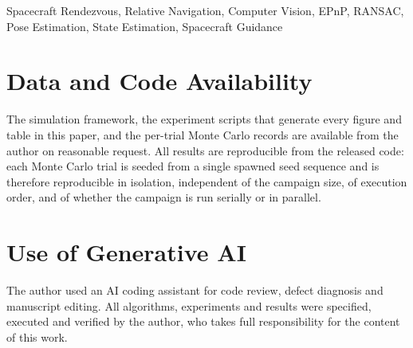 \documentclass[conference]{IEEEtran}
\begin{document}
\begin{IEEEkeywords}
Spacecraft Rendezvous, Relative Navigation, Computer Vision,
EPnP, RANSAC, Pose Estimation, State Estimation, Spacecraft Guidance
\end{IEEEkeywords}
















\section*{Data and Code Availability}

The simulation framework, the experiment scripts that generate every figure
and table in this paper, and the per-trial Monte Carlo records are available
from the author on reasonable request. All results are reproducible from the
released code: each Monte Carlo trial is seeded from a single spawned seed
sequence and is therefore reproducible in isolation, independent of the
campaign size, of execution order, and of whether the campaign is run serially
or in parallel.

\section*{Use of Generative AI}

The author used an AI coding assistant for code review, defect diagnosis and
manuscript editing. All algorithms, experiments and results were specified,
executed and verified by the author, who takes full responsibility for the
content of this work.



\end{document}
